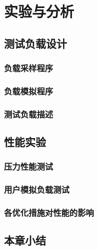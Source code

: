 
\chapter{实验与分析}
\section{测试负载设计}
\subsection{负载采样程序}
\subsection{负载模拟程序}
\subsection{测试负载描述}
\section{性能实验}
\subsection{压力性能测试}
\subsection{用户模拟负载测试}
\subsection{各优化措施对性能的影响}
\section{本章小结}